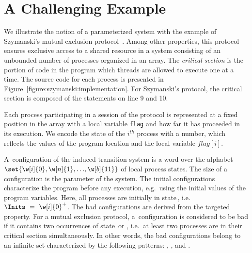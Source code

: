\section{A Challenging Example}
\label{section:paramsys:example}
%
We illustrate the notion of a parameterized system with the example of
Szymanski's mutual exclusion protocol~\cite{Szymanski88,Szymanski90}.
%
%
%
Among other properties, this protocol ensures exclusive access to a
shared resource in a system consisting of an unbounded number of
processes organized in an array.
%
%
The \emph{critical section} is the portion of code in the program
which threads are allowed to execute one at a time.
%
The source code for each process is presented in
Figure~\ref{figure:szymanski:implementation}. For Szymanski's
protocol, the critical section is composed of the statements on line 9
and 10.

Each process participating in a session of the protocol is represented
at a fixed position in the array with a local variable \texttt{flag}
and how far it has proceeded in its execution.
%
We encode the state of the $i^{th}$ process with a number, which
reflects the values of the program location and the local variable
$\mathit{flag}[i]$.

%
A~configuration of the induced transition system is a word over the
alphabet $\set{\w[i]{0}, \w[n]{1}, {\ldots}, \w[b]{11}}$ of local
process states.
%
The size of a configuration is the parameter of the system.
%
The initial configurations characterize the program before any
execution, e.g.\ using the initial values of the program variables.
Here, all processes are initially in state\,, i.e.\
$\Inits~=~{\w[i]{0}}^+$.
%
The bad configurations are derived from the targeted property.
%
For a mutual exclusion protocol, a~configuration is considered to be
bad if it contains two occurrences of state\,\w[b]{9} or \w[b]{10},
i.e.\ at least two processes are in their critical section
simultaneously.
In other words, the bad configurations belong to an
infinite set characterized by the following patterns: %
{}, %
{}, %
{} and %
{}.

